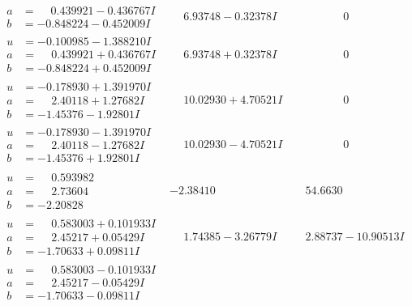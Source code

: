 \documentclass[1p]{elsarticle_modified}
\theoremstyle{definition}
\begin{document}
$$\begin{array}{c|c|c}
\begin{aligned}
a &= \phantom{-}0.439921 - 0.436767 I \\
b &= -0.848224 - 0.452009 I\end{aligned}
 & \phantom{-}6.93748 - 0.32378 I & \phantom{-0.000000 } 0 \\ \hline\begin{aligned}
u &= -0.100985 - 1.388210 I \\
a &= \phantom{-}0.439921 + 0.436767 I \\
b &= -0.848224 + 0.452009 I\end{aligned}
 & \phantom{-}6.93748 + 0.32378 I & \phantom{-0.000000 } 0 \\ \hline\begin{aligned}
u &= -0.178930 + 1.391970 I \\
a &= \phantom{-}2.40118 + 1.27682 I \\
b &= -1.45376 - 1.92801 I\end{aligned}
 & \phantom{-}10.02930 + 4.70521 I & \phantom{-0.000000 } 0 \\ \hline\begin{aligned}
u &= -0.178930 - 1.391970 I \\
a &= \phantom{-}2.40118 - 1.27682 I \\
b &= -1.45376 + 1.92801 I\end{aligned}
 & \phantom{-}10.02930 - 4.70521 I & \phantom{-0.000000 } 0 \\ \hline\begin{aligned}
u &= \phantom{-}0.593982\phantom{ +0.000000I} \\
a &= \phantom{-}2.73604\phantom{ +0.000000I} \\
b &= -2.20828\phantom{ +0.000000I}\end{aligned}
 & -2.38410\phantom{ +0.000000I} & \phantom{-}54.6630\phantom{ +0.000000I} \\ \hline\begin{aligned}
u &= \phantom{-}0.583003 + 0.101933 I \\
a &= \phantom{-}2.45217 + 0.05429 I \\
b &= -1.70633 + 0.09811 I\end{aligned}
 & \phantom{-}1.74385 - 3.26779 I & \phantom{-}2.88737 - 10.90513 I \\ \hline\begin{aligned}
u &= \phantom{-}0.583003 - 0.101933 I \\
a &= \phantom{-}2.45217 - 0.05429 I \\
b &= -1.70633 - 0.09811 I\end{aligned}

\end{array}$$
\end{document}
